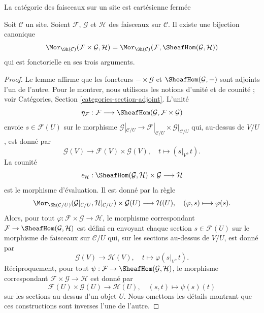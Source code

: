 \begin{lemma}
\label{lemma-internal-hom-sheaf}
\begin{slogan}
La catégorie des faisceaux sur un site est cartésienne fermée
\end{slogan}
Soit $\mathcal{C}$ un site. Soient $\mathcal{F}$, $\mathcal{G}$ et
$\mathcal{H}$ des faisceaux sur $\mathcal{C}$. Il existe une bijection canonique
$$
\Mor_{\Sh(\mathcal{C})}(\mathcal{F}\times\mathcal{G},\mathcal{H}) =
\Mor_{\Sh(\mathcal{C})}(\mathcal{F},\SheafHom(\mathcal{G},\mathcal{H}))
$$
qui est fonctorielle en ses trois arguments.
\end{lemma}

\begin{proof}
Le lemme affirme que les foncteurs $-\times\mathcal{G}$ et
$\SheafHom(\mathcal{G},-)$ sont adjoints l’un de l’autre.
Pour le montrer, nous utilisons les notions d’unité et de counité ; voir
Catégories, Section \ref{categories-section-adjoint}.
L’unité
$$
\eta_\mathcal{F} :
\mathcal{F}
\longrightarrow
\SheafHom(\mathcal{G},\mathcal{F}\times\mathcal{G})
$$
envoie $s \in \mathcal{F}(U)$ sur le morphisme
$\mathcal{G}|_{\mathcal{C}/U} \to
\mathcal{F}|_{\mathcal{C}/U}\times\mathcal{G}|_{\mathcal{C}/U}$
qui, au-dessus de $V/U$, est donné par
$$
\mathcal{G}(V) \longrightarrow \mathcal{F}(V)\times \mathcal{G}(V), \quad
t \longmapsto (s|_{V},t).
$$
La counité
$$
\epsilon_{\mathcal{H}} :
\SheafHom(\mathcal{G}, \mathcal{H}) \times \mathcal{G}
\longrightarrow
\mathcal{H}
$$
est le morphisme d’évaluation. Il est donné par la règle
$$
\Mor_{\Sh(\mathcal{C}/U)}(
\mathcal{G}|_{\mathcal{C}/U}, \mathcal{H}|_{\mathcal{C}/U})
\times \mathcal{G}(U)
\longrightarrow
\mathcal{H}(U),\quad
(\varphi, s) \longmapsto \varphi(s).
$$
Alors, pour tout $\varphi : \mathcal{F} \times \mathcal{G} \to \mathcal{H}$,
le morphisme correspondant
$\mathcal{F} \to \SheafHom(\mathcal{G},\mathcal{H})$
est défini en envoyant chaque section $s \in \mathcal{F}(U)$
sur le morphisme de faisceaux sur $\mathcal{C}/U$ qui, sur les
sections au-dessus de $V/U$, est donné par
$$
\mathcal{G}(V) \longrightarrow \mathcal{H}(V),\quad
t \longmapsto \varphi(s|_V, t).
$$
Réciproquement, pour tout
$\psi : \mathcal{F} \to \SheafHom(\mathcal{G}, \mathcal{H})$,
le morphisme correspondant
$\mathcal{F} \times \mathcal{G} \to \mathcal{H}$ est donné par
$$
\mathcal{F}(U) \times \mathcal{G}(U) \longrightarrow \mathcal{H}(U),\quad
(s, t) \longmapsto \psi(s)(t)
$$
sur les sections au-dessus d’un objet $U$. Nous omettons les détails montrant
que ces constructions sont inverses l’une de l’autre.
\end{proof}

